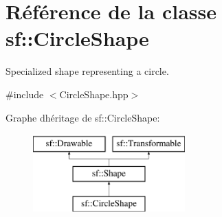 \hypertarget{classsf_1_1CircleShape}{}\section{Référence de la classe sf\+:\+:Circle\+Shape}
\label{classsf_1_1CircleShape}


Specialized shape representing a circle.  




{\ttfamily \#include $<$Circle\+Shape.\+hpp$>$}

Graphe d\textquotesingle{}héritage de sf\+:\+:Circle\+Shape\+:\begin{figure}[H]
\begin{center}
\leavevmode
\includegraphics[height=3.000000cm]{classsf_1_1CircleShape}
\end{center}
\end{figure}
